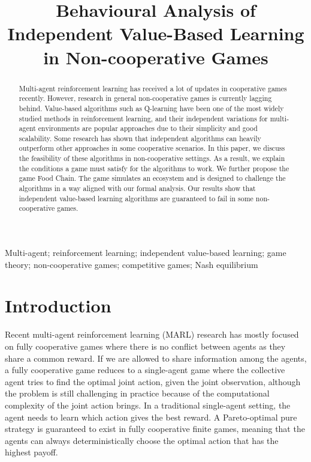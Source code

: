 \documentclass[]{interact}
\theoremstyle{plain}%
\theoremstyle{definition}
\theoremstyle{remark}
\begin{document}

\title{Behavioural Analysis of Independent Value-Based Learning in Non-cooperative Games}

\author{
}

\maketitle

\begin{abstract}
Multi-agent reinforcement learning has received a lot of updates in cooperative games recently. However, research in general non-cooperative games is currently lagging behind. Value-based algorithms such as Q-learning have been one of the most widely studied methods in reinforcement learning, and their independent variations for multi-agent environments are popular approaches due to their simplicity and good scalability. Some research has shown that independent algorithms can heavily outperform other approaches in some cooperative scenarios. In this paper, we discuss the feasibility of these algorithms in non-cooperative settings. As a result, we explain the conditions a game must satisfy for the algorithms to work. We further propose the game Food Chain. The game simulates an ecosystem and is designed to challenge the algorithms in a way aligned with our formal analysis. Our results show that independent value-based learning algorithms are guaranteed to fail in some non-cooperative games.
\end{abstract}

\begin{keywords}
Multi-agent; reinforcement learning; independent value-based learning; game theory; non-cooperative games; competitive games; Nash equilibrium
\end{keywords}

\section{Introduction}
Recent multi-agent reinforcement learning (MARL) research has mostly focused on fully cooperative games \cite{yu2020benchmarking, papoudakis2020benchmarking, zhu2024survey} where there is no conflict between agents as they share a common reward. If we are allowed to share information among the agents, a fully cooperative game reduces to a single-agent game where the collective agent tries to find the optimal joint action, given the joint observation, although the problem is still challenging in practice because of the computational complexity of the joint action brings. In a traditional single-agent setting, the agent needs to learn which action gives the best reward. A Pareto-optimal pure strategy is guaranteed to exist in fully cooperative finite games, meaning that the agents can always deterministically choose the optimal action that has the highest payoff.
\end{document}

